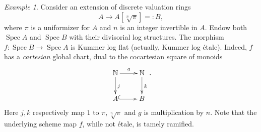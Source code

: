 \documentclass[a4paper,11pt]{amsart} %
\numberwithin{equation}{subsection}
\newcommand{\bb}[1]{{\mathbb{#1}}}
\newcommand{\bd}[1]{{\mathbf{#1}}}
\newcommand{\ul}[1]{{\underline{#1}}}
\newcommand{\cat}[1]{\bd{#1}}
\newcommand{\Spec}{\operatorname{Spec}}
\theoremstyle{definition}
\newtheorem{definition}{Definition}[section]
\theoremstyle{plain}%
\theoremstyle{remark}
\newtheorem{example}[definition]{Example}
\begin{document}



\begin{example}\label{Klflat_morphism}
    Consider an extension of discrete valuation rings
    \[
    A \to A[\sqrt[n]{\pi}]=:B,
    \]
    where $\pi$ is a uniformizer for $A$ and $n$ is an integer invertible in $A$. Endow both $\Spec A$ and $\Spec B$ with their divisorial log structures. The morphism $f \colon \Spec B \to \Spec A$ is Kummer log flat (actually, Kummer log étale). Indeed, $f$ has a \emph{cartesian} global chart, dual to the cocartesian square of monoids
    \begin{equation*}
        \xymatrix{
        \bb N \ar[d]^{j} \ar[r]^{g} & \bb N\ar[d]^{k} \\
        A \ar@{^{(}->}[r] & B \\}.
    \end{equation*}
    Here $j,k$ respectively map $1$ to $\pi,\sqrt[n]{\pi}$ and $g$ is multiplication by $n$. Note that the underlying scheme map $\ul f$, while not étale, is tamely ramified.
\end{example}
\end{document}
